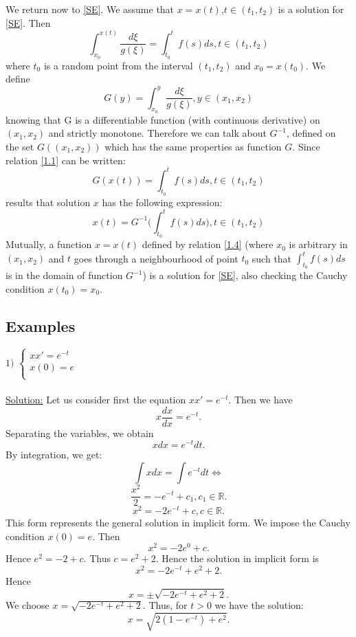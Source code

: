\documentclass[a4paper,11pt]{report}
\newcommand{\R}{\mathbb{R}}
\begin{document}
We return now to \eqref{SE}.
We assume that $x=x(t)$,$t\in(t_1,t_2)$ is a solution for \eqref{SE}. Then
\begin{equation}
 \int_{x_0}^{x(t)}\frac{d\xi}{g(\xi)} = \int_{t_0}^{t}f(s)ds, t\in (t_1,t_2) \label{1.1} \tag{1.1}
\end{equation}
where $t_0$ is a random point from the interval $(t_1,t_2)$ and $x_0=x(t_0)$. We define
\begin{equation}
 G(y)=\int_{x_0}^{y}\frac{d\xi}{g(\xi)}, y\in(x_1,x_2) \label{1.2} \tag{1.2}
\end{equation}
knowing that G is a differentiable function (with continuous derivative) on $(x_1,x_2)$ and strictly monotone. Therefore we can talk about $G^{-1}$, defined on the set $G((x_1,x_2))$
which has the same properties as function $G$. Since relation \eqref{1.1} can be written:
\begin{equation}
 G(x(t))=\int_{t_0}^{t} f(s)ds, t\in(t_1,t_2) \label{1.3}\tag{1.3}
\end{equation}
results that solution $x$ has the following expression:
\begin{equation}
 x(t)=G^{-1}\bigg(\int_{t_0}^{t} f(s)ds\bigg), t\in(t_1,t_2) \label{1.4}\tag{1.4}
\end{equation}
Mutually, a function $x=x(t)$ defined by relation \eqref{1.4} (where $x_0$ is arbitrary in $(x_1,x_2)$ and $t$ goes through a neighbourhood of point $t_0$ such that $\int_{t_0}^{t} f(s)ds$ is
in the domain of function $G^{-1}$) is a solution for \eqref{SE}, also checking the Cauchy condition $x(t_0)=x_0$.


\subsection{Examples}
$1)$ 
      $\begin{cases}
       xx'=e^{-t}\\
       x(0)=e\\
      \end{cases}$\\\\
      \underline{Solution:} Let us consider first the equation $xx'=e^{-t}$. Then we have $$x\frac{dx}{dx}=e^{-t}.$$
      Separating the variables, we obtain $$xdx=e^{-t}dt.$$ By integration, we get: $$\int xdx =\int e^{-t}dt \Leftrightarrow$$ $$\frac{x^{2}}{2}=-e^{-t}+c_{1}, c_{1}\in \R.$$
      $$x^{2}=-2e^{-t}+c, c\in \R.$$
      This form represents the general solution in implicit form. We impose the Cauchy condition $x(0)=e.$ Then $$x^{2}=-2e^{0}+c.$$ Hence $e^{2}=-2+c.$ Thus $c=e^{2}+2$. Hence the solution in implicit form is $$x^{2}=-2e^{-t}+e^{2}+2.$$ Hence $$x=\pm\sqrt{-2e^{-t}+e^{2}+2}.$$ We choose $x=\sqrt{-2e^{-t}+e^{2}+2}.$ Thus, for $t>0$ we have the solution: $$x=\sqrt{2(1-e^{-t})+e^{2}}.$$
      
\end{document}
